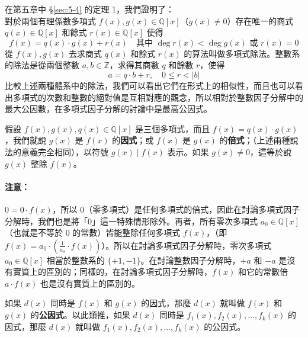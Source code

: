 在第五章中 \S\ref{sec:5-4} 的定理 1，我們證明了：\\
對於兩個有理係數多項式 $f(x), g(x) \in \mathbb{Q}[x]$（$g(x) \neq 0$）存在唯一的商式 $q(x) \in \mathbb{Q}[x]$ 和餘式 $r(x) \in \mathbb{Q}[x]$ 使得
\begin{equation}
  f(x) = q(x) \cdot g(x) + r(x) \quad \text{其中 } \deg r(x) < \deg g(x) \text{ 或 } r(x) = 0 \label{eq:poly_div_uniq}
\end{equation}
從 $f(x), g(x)$ 去求商式 $q(x)$ 和餘式 $r(x)$ 的算法叫做多項式除法。整數系的除法是從兩個整數 $a, b \in \mathbb{Z}$，求得其商數 $q$ 和餘數 $r$，使得
\begin{equation}
  a = q \cdot b + r, \quad 0 \le r < |b| \label{eq:int_div_uniq}
\end{equation}
比較上述兩種體系中的除法，我們可以看出它們在形式上的相似性，而且也可以看出多項式的次數和整數的絕對值是互相對應的觀念，所以相對於整數因子分解中的最大公因數，在多項式因子分解的討論中是最高公因式。

\begin{definition*}
假設 $f(x), g(x), q(x) \in \mathbb{Q}[x]$ 是三個多項式，而且 $f(x) = q(x) \cdot g(x)$，我們就說 $g(x)$ 是 $f(x)$ 的\textbf{因式}；或 $f(x)$ 是 $g(x)$ 的\textbf{倍式}；（上述兩種說法的意義完全相同），以符號 $g(x) \mid f(x)$ 表示。如果 $g(x) \neq 0$，這等於說 $g(x)$ 整除 $f(x)$。
\end{definition*}

\paragraph{注意：}
$0 = 0 \cdot f(x)$，所以 $0$（零多項式）是任何多項式的倍式，因此在討論多項式因子分解時，我們也是將「$0$」這一特殊情形除外。再者，所有零次多項式 $a_0 \in \mathbb{Q}[x]$（也就是不等於 $0$ 的常數）皆能整除任何多項式 $f(x)$，（即 $f(x) = a_0 \cdot \left(\frac{1}{a_0} \cdot f(x)\right)$）。所以在討論多項式因子分解時，零次多項式 $a_0 \in \mathbb{Q}[x]$ 相當於整數系的 $\{+1, -1\}$。在討論整數因子分解時，$+a$ 和 $-a$ 是沒有實質上的區別的；同樣的，在討論多項式因子分解時，$f(x)$ 和它的常數倍 $a \cdot f(x)$ 也是沒有實質上的區別的。

\begin{definition*}
如果 $d(x)$ 同時是 $f(x)$ 和 $g(x)$ 的因式，那麼 $d(x)$ 就叫做 $f(x)$ 和 $g(x)$ 的\textbf{公因式}。以此類推，如果 $d(x)$ 同時是 $f_1(x), f_2(x), \dots, f_k(x)$ 的因式，那麼 $d(x)$ 就叫做 $f_1(x), f_2(x), \dots, f_k(x)$ 的公因式。
\end{definition*}

